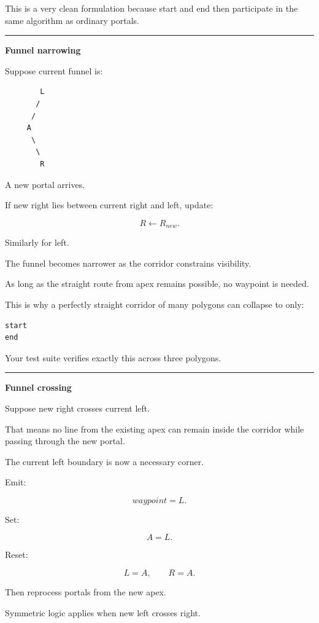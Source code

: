 This is a very clean formulation because start and end then participate in the same algorithm as ordinary portals.

\begin{center}\rule{0.5\linewidth}{0.5pt}\end{center}

\textbf{Funnel narrowing}

Suppose current funnel is:

\begin{verbatim}
        L
       /
      /
     A
      \
       \
        R
\end{verbatim}

A new portal arrives.

If new right lies between current right and left, update:

\[
R\leftarrow R_{new}.
\]

Similarly for left.

The funnel becomes narrower as the corridor constrains visibility.

As long as the straight route from apex remains possible, no waypoint is needed.

This is why a perfectly straight corridor of many polygons can collapse to only:

\begin{verbatim}
start
end
\end{verbatim}

Your test suite verifies exactly this across three polygons.

\begin{center}\rule{0.5\linewidth}{0.5pt}\end{center}

\textbf{Funnel crossing}

Suppose new right crosses current left.

That means no line from the existing apex can remain inside the corridor while passing through the new portal.

The current left boundary is now a necessary corner.

Emit:

\[
waypoint=L.
\]

Set:

\[
A=L.
\]

Reset:

\[
L=A,
\qquad
R=A.
\]

Then reprocess portals from the new apex.

Symmetric logic applies when new left crosses right.

